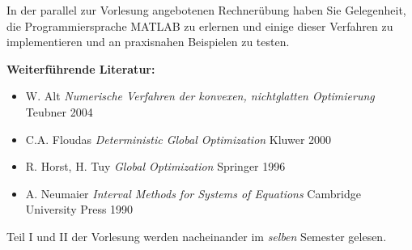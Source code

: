 \begin{course}
\begin{content}
In der parallel zur Vorlesung angebotenen Rechnerübung haben Sie Gelegenheit, die Programmiersprache MATLAB zu erlernen und einige dieser Verfahren zu implementieren und an praxisnahen Beispielen zu testen.


\end{content}



\begin{literature}\textbf{Weiterführende Literatur:}

 \begin{itemize}\item W. Alt \emph{Numerische Verfahren der konvexen, nichtglatten Optimierung }Teubner 2004  \item C.A. Floudas \emph{Deterministic Global Optimization }Kluwer 2000  \item R. Horst, H. Tuy \emph{Global Optimization }Springer 1996  \item A. Neumaier \emph{Interval Methods for Systems of Equations }Cambridge University Press 1990  \end{itemize}\end{literature}

\begin{remarks}Teil I und II der Vorlesung werden nacheinander im \emph{selben }Semester gelesen.

\end{remarks}

\end{course}